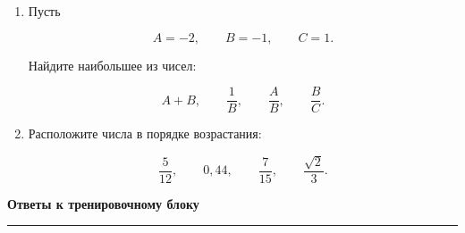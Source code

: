 \documentclass[a4paper,12pt]{article}
\newcommand{\topic}[1]{%
    \par\vspace{0.9em}%
    {\Large\bfseries\color{darkaccent}#1}\par
    \vspace{0.25em}
    \noindent
    \color{accent}\rule{\linewidth}{0.6pt}
    \color{black}
    \vspace{0.55em}
}
\begin{document}
\begin{enumerate}[label=\textbf{\arabic*.}]
\begin{enumerate}[label=\arabic*)]
        \item
        \[
        -a<0.
        \]
    \end{enumerate}


    \item
    Пусть

    \[
    A=-2,
    \qquad
    B=-1,
    \qquad
    C=1.
    \]

    Найдите наибольшее из чисел:

    \[
    A+B,
    \qquad
    \frac1B,
    \qquad
    \frac AB,
    \qquad
    \frac BC.
    \]


    \item
    Расположите числа в порядке возрастания:

    \[
    \frac{5}{12},
    \qquad
    0{,}44,
    \qquad
    \frac{7}{15},
    \qquad
    \frac{\sqrt2}{3}.
    \]

\end{enumerate}


\clearpage

\topic{Ответы к тренировочному блоку}

\renewcommand{\arraystretch}{1.4}
\end{document}
